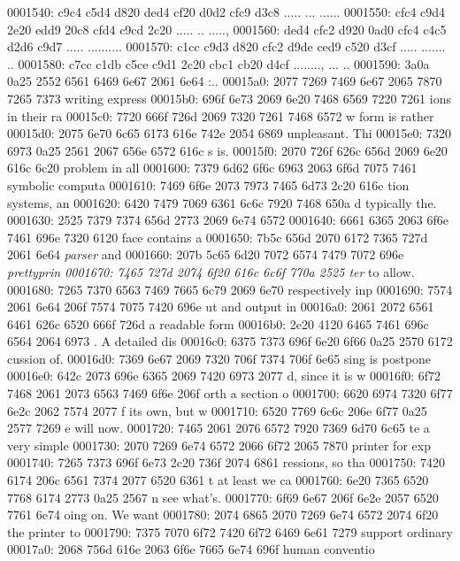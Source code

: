 \begin{bo
00010e0: 7865 647d 5c62 6567 696e 7b76 6572 6261  xed}
\begin{verba
00010f0: 7469 6d7d 0a20 2023 7479 7065 2074 6572  tim}
0001540: c9c4 c5d4 d820 ded4 cf20 d0d2 cfc9 d3c8  ..... ... ......
0001550: cfc4 c9d4 2e20 edd9 20c8 cfd4 c9cd 2c20  ..... .. ....., 
0001560: ded4 cfc2 d920 0ad0 cfc4 c4c5 d2d6 c9d7  ..... ..........
0001570: c1cc c9d3 d820 cfc2 d9de ced9 c520 d3cf  ..... ....... ..
0001580: c7cc c1db c5ce c9d1 2c20 cbc1 cb20 d4cf  ........, ... ..
0001590: 3a0a 0a25 2552 6561 6469 6e67 2061 6e64  :..%
00015a0: 2077 7269 7469 6e67 2065 7870 7265 7373   writing express
00015b0: 696f 6e73 2069 6e20 7468 6569 7220 7261  ions in their ra
00015c0: 7720 666f 726d 2069 7320 7261 7468 6572  w form is rather
00015d0: 2075 6e70 6c65 6173 616e 742e 2054 6869   unpleasant. Thi
00015e0: 7320 6973 0a25 2561 2067 656e 6572 616c  s is.%
00015f0: 2070 726f 626c 656d 2069 6e20 616c 6c20   problem in all 
0001600: 7379 6d62 6f6c 6963 2063 6f6d 7075 7461  symbolic computa
0001610: 7469 6f6e 2073 7973 7465 6d73 2c20 616e  tion systems, an
0001620: 6420 7479 7069 6361 6c6c 7920 7468 650a  d typically the.
0001630: 2525 7379 7374 656d 2773 2069 6e74 6572  %
0001640: 6661 6365 2063 6f6e 7461 696e 7320 6120  face contains a 
0001650: 7b5c 656d 2070 6172 7365 727d 2061 6e64  {\em parser} and
0001660: 207b 5c65 6d20 7072 6574 7479 7072 696e   {\em prettyprin
0001670: 7465 727d 2074 6f20 616c 6c6f 770a 2525  ter} to allow.%
0001680: 7265 7370 6563 7469 7665 6c79 2069 6e70  respectively inp
0001690: 7574 2061 6e64 206f 7574 7075 7420 696e  ut and output in
00016a0: 2061 2072 6561 6461 626c 6520 666f 726d   a readable form
00016b0: 2e20 4120 6465 7461 696c 6564 2064 6973  . A detailed dis
00016c0: 6375 7373 696f 6e20 6f66 0a25 2570 6172  cussion of.%
00016d0: 7369 6e67 2069 7320 706f 7374 706f 6e65  sing is postpone
00016e0: 642c 2073 696e 6365 2069 7420 6973 2077  d, since it is w
00016f0: 6f72 7468 2061 2073 6563 7469 6f6e 206f  orth a section o
0001700: 6620 6974 7320 6f77 6e2c 2062 7574 2077  f its own, but w
0001710: 6520 7769 6c6c 206e 6f77 0a25 2577 7269  e will now.%
0001720: 7465 2061 2076 6572 7920 7369 6d70 6c65  te a very simple
0001730: 2070 7269 6e74 6572 2066 6f72 2065 7870   printer for exp
0001740: 7265 7373 696f 6e73 2c20 736f 2074 6861  ressions, so tha
0001750: 7420 6174 206c 6561 7374 2077 6520 6361  t at least we ca
0001760: 6e20 7365 6520 7768 6174 2773 0a25 2567  n see what's.%
0001770: 6f69 6e67 206f 6e2e 2057 6520 7761 6e74  oing on. We want
0001780: 2074 6865 2070 7269 6e74 6572 2074 6f20   the printer to 
0001790: 7375 7070 6f72 7420 6f72 6469 6e61 7279  support ordinary
00017a0: 2068 756d 616e 2063 6f6e 7665 6e74 696f   human conventio

\end{verba
00010f0: 7469 6d7d 0a20 2023 7479 7065 2074 6572  tim}
\end{bo
00010e0: 7865 647d 5c62 6567 696e 7b76 6572 6261  xed}
